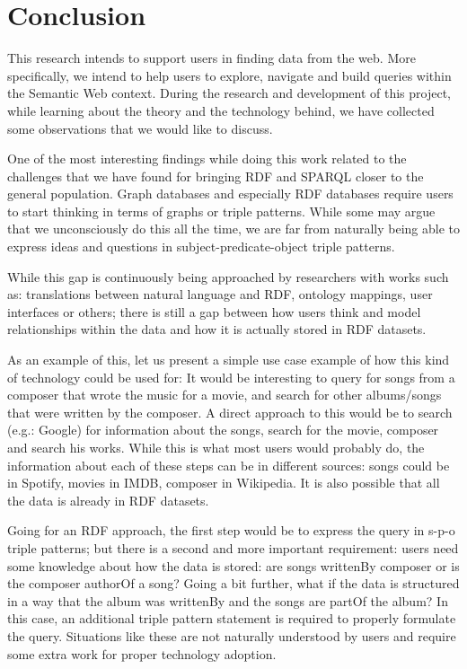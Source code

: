 \chapter{Conclusion}
\label{chap:Conclusion}

This research intends to support users in finding data from the web. More specifically, we intend to help users to explore, navigate and build queries within the Semantic Web context. During the research and development of this project, while learning about the theory and the technology behind, we have collected some observations that we would like to discuss.

One of the most interesting findings while doing this work related to the challenges that we have found for bringing RDF and SPARQL closer to the general population. Graph databases and especially RDF databases require users to start thinking in terms of graphs or triple patterns. While some may argue that we unconsciously do this all the time, we are far from naturally being able to express ideas and questions in subject-predicate-object triple patterns.

While this gap is continuously being approached by researchers with works such as: translations between natural language and RDF, ontology mappings, user interfaces or others; there is still a gap between how users think and model relationships within the data and how it is actually stored in RDF datasets.

As an example of this, let us present a simple use case example of how this kind of technology could be used for: It would be interesting to query for songs from a composer that wrote the music for a movie, and search for other albums/songs that were written by the composer. A direct approach to this would be to search (e.g.: Google) for information about the songs, search for the movie, composer and search his works. While this is what most users would probably do, the information about each of these steps can be in different sources: songs could be in Spotify, movies in IMDB, composer in Wikipedia. It is also possible that all the data is already in RDF datasets.

Going for an RDF approach, the first step would be to express the query in s-p-o triple patterns; but there is a second and more important requirement: users need some knowledge about how the data is stored: are songs writtenBy composer or is the composer authorOf a song? Going a bit further, what if the data is structured in a way that the album was writtenBy and the songs are partOf the album? In this case, an additional triple pattern statement is required to properly formulate the query. Situations like these are not naturally understood by users and require some extra work for proper technology adoption.

